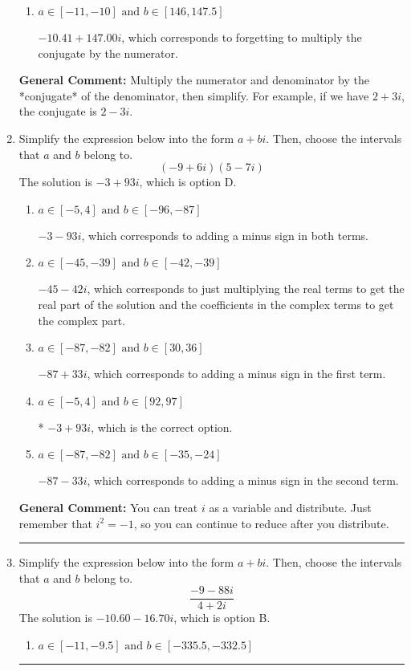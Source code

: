 \documentclass{extbook}[14pt]
\newcommand{\litem}[1]{\item #1

\rule{\textwidth}{0.4pt}}
\begin{document}
\begin{enumerate}
{\begin{enumerate}[label=\Alph*.]
 $-177.00  + 8.65 i$, which corresponds to forgetting to multiply the conjugate by the numerator and using a plus instead of a minus in the denominator.
\item \( a \in [-11, -10] \text{ and } b \in [146, 147.5] \)

 $-10.41  + 147.00 i$, which corresponds to forgetting to multiply the conjugate by the numerator.
\end{enumerate}

\textbf{General Comment:} Multiply the numerator and denominator by the *conjugate* of the denominator, then simplify. For example, if we have $2+3i$, the conjugate is $2-3i$.
}
\litem{
Simplify the expression below into the form $a+bi$. Then, choose the intervals that $a$ and $b$ belong to.
\[ (-9 + 6 i)(5 - 7 i) \]
The solution is \( -3 + 93 i \), which is option D.\begin{enumerate}[label=\Alph*.]
\item \( a \in [-5, 4] \text{ and } b \in [-96, -87] \)

 $-3 - 93 i$, which corresponds to adding a minus sign in both terms.
\item \( a \in [-45, -39] \text{ and } b \in [-42, -39] \)

 $-45 - 42 i$, which corresponds to just multiplying the real terms to get the real part of the solution and the coefficients in the complex terms to get the complex part.
\item \( a \in [-87, -82] \text{ and } b \in [30, 36] \)

 $-87 + 33 i$, which corresponds to adding a minus sign in the first term.
\item \( a \in [-5, 4] \text{ and } b \in [92, 97] \)

* $-3 + 93 i$, which is the correct option.
\item \( a \in [-87, -82] \text{ and } b \in [-35, -24] \)

 $-87 - 33 i$, which corresponds to adding a minus sign in the second term.
\end{enumerate}

\textbf{General Comment:} You can treat $i$ as a variable and distribute. Just remember that $i^2=-1$, so you can continue to reduce after you distribute.
}
\litem{
Simplify the expression below into the form $a+bi$. Then, choose the intervals that $a$ and $b$ belong to.
\[ \frac{-9 - 88 i}{4 + 2 i} \]
The solution is \( -10.60  - 16.70 i \), which is option B.\begin{enumerate}[label=\Alph*.]
\item \( a \in [-11, -9.5] \text{ and } b \in [-335.5, -332.5] \)


\end{enumerate}}
\end{enumerate}
\end{document}
